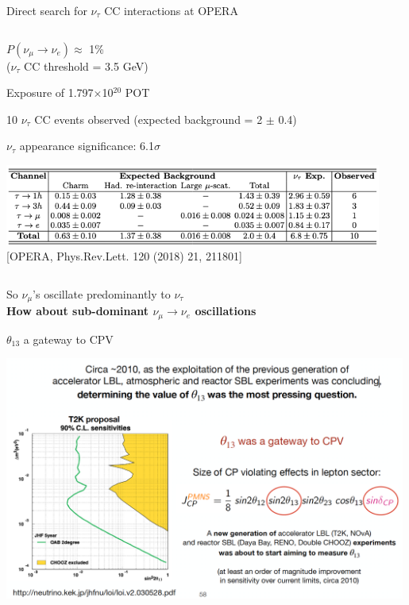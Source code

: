 \begin{frame}[t]{Direct search for $\nu_{\tau}$ CC interactions at OPERA}
\begin{columns}
\begin{column}{0.60\textwidth}
\begin{itemize}
{           $P(\nu_{\mu} \rightarrow \nu_{e}) \approx$ 1\%\\
           ($\nu_{\tau}$ CC threshold = 3.5 GeV)
     \item Exposure of 1.797$\times$10$^{20}$ POT
     \item 10 $\nu_{\tau}$ CC events observed (expected background = 2 $\pm$ 0.4)
     \item $\nu_{\tau}$ appearance significance: 6.1$\sigma$
    }
    \end{itemize}
    \includegraphics[width=0.93\textwidth]{./images/3nu/accelerator/opera_tau_events_final.png}\\
    {\scriptsize \color{blue}[OPERA, Phys.Rev.Lett. 120 (2018) 21, 211801]}
  \end{column}
\end{columns}
\end{frame}

%
%

\begin{frame}[plain,c]
\begin{center}
{\Large
 So $\nu_{\mu}$'s oscillate predominantly to $\nu_{\tau}$\\
 \vspace{0.2cm}
 {\bf How about sub-dominant $\nu_{\mu}\rightarrow\nu_{e}$ oscillations}
}
\end{center}
\end{frame}

%
%

\begin{frame}[t]{$\theta_{13}$ a gateway to CPV}

\begin{center}
  \includegraphics[width=0.99\textwidth]{./images/3nu/accelerator/theta13_gateway_cpv_t2k_proposal.png}
\end{center}

\end{frame}


